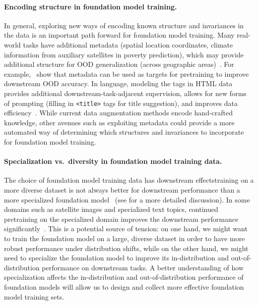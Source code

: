 \paragraph{Encoding structure in foundation model training.}
In general, exploring new ways of encoding known structure and invariances in the data is an important path forward for foundation model training. Many real-world tasks have additional metadata (\eg spatial location coordinates, climate information from auxiliary satellites in poverty prediction), which may provide additional structure for OOD generalization (\eg across geographic areas)~\citep{xie2021innout,koh2021wilds}. For example,~\citet{xie2021innout} show that metadata can be used as targets for pretraining to improve downstream OOD accuracy. In language, modeling the tags in HTML data provides additional downstream-task-adjacent supervision, allows for new forms of prompting (\eg filling in \texttt{<title>} tags for title suggestion), and improves data efficiency~\citep{aghajanyan2021HTLM}. While current data augmentation methods encode hand-crafted knowledge, other avenues such as exploiting metadata could provide a more automated way of determining which structures and invariances to incorporate for foundation model training. 

\paragraph{Specialization vs.~diversity in foundation model training data.}
The choice of foundation model training data has downstream effects\dash{}training on a more diverse dataset is not always better for downstream performance than a more specialized foundation model~\citep{cole2021contrastive,chalkidis2020legal} (see  for a more detailed discussion).
In some domains such as satellite images and specialized text topics, continued pretraining on the specialized domain improves the downstream performance significantly~\citep{reed2021selfsupervised,gururangan2020dont}.
This is a potential source of tension: on one hand, we might want to train the foundation model on a large, diverse dataset in order to have more robust performance under distribution shifts, while on the other hand, we might need to specialize the foundation model to improve its in-distribution and out-of-distribution performance on downstream tasks.
A better understanding of how specialization affects the in-distribution and out-of-distribution performance of foundation models will allow us to design and collect more effective foundation model training sets.


